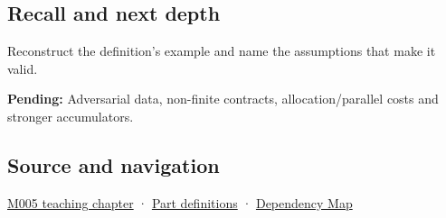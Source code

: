 \subsection{Recall and next depth}\label{appendix-df318da57389-recall-and-next-depth}

Reconstruct the definition's example and name the assumptions that make it valid.

\textbf{Pending:} Adversarial data, non-finite contracts, allocation/parallel costs and stronger accumulators.

\subsection{Source and navigation}\label{appendix-df318da57389-source-and-navigation}

\hyperref[01-foundations-i-ch001-when-arithmetic-meets-uncertainty]{M005 teaching chapter} · \hyperref[appendix-fd090d982a15-m005---parts-77-88]{Part definitions} · \hyperref[appendix-4ad47bdd269a]{Dependency Map}
